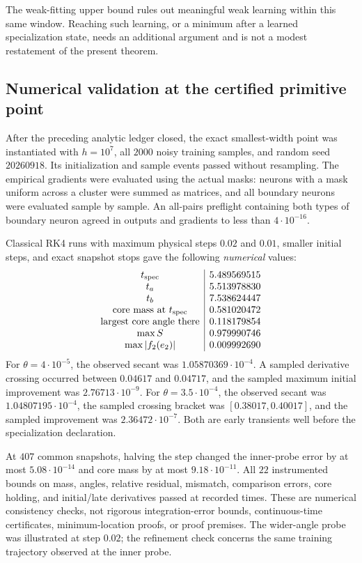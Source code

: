 \documentclass[11pt]{article}
\theoremstyle{remark}
\begin{document}
The weak-fitting upper bound rules out meaningful weak learning within
this same window. Reaching such learning, or a minimum after a learned
specialization state, needs an additional argument and is not a modest
restatement of the present theorem.

\subsection{Numerical validation at the certified primitive point}

After the preceding analytic ledger closed, the exact smallest-width
point was instantiated with $h=10^7$, all $2000$ noisy training samples,
and random seed $20260918$. Its initialization and sample events passed
without resampling. The empirical gradients were evaluated using the
actual masks: neurons with a mask uniform across a cluster were summed
as matrices, and all boundary neurons were evaluated sample by sample.
An all-pairs preflight containing both types of boundary neuron agreed
in outputs and gradients to less than $4\cdot10^{-16}$.

Classical RK4 runs with maximum physical steps $0.02$ and $0.01$,
smaller initial steps, and exact snapshot stops gave the following
\emph{numerical} values:
\[
\begin{array}{c|r}
 t_{\rm spec}&5.489569515\\
 t_a&5.513978830\\
 t_b&7.538624447\\
 \text{core mass at }t_{\rm spec}&0.581020472\\
 \text{largest core angle there}&0.118179854\\
 \max S&0.979990746\\
 \max |f_2(e_2)|&0.009992690
\end{array}
\]
For $\theta=4\cdot10^{-5}$, the observed secant was
$1.05870369\cdot10^{-4}$. A sampled derivative crossing occurred between
$0.04617$ and $0.04717$, and the sampled maximum initial improvement was
$2.76713\cdot10^{-9}$.
For $\theta=3.5\cdot10^{-4}$, the observed secant was
$1.04807195\cdot10^{-4}$, the sampled crossing bracket was
$[0.38017,0.40017]$, and the sampled improvement was
$2.36472\cdot10^{-7}$. Both are early transients well before the
specialization declaration.

At $407$ common snapshots, halving the step changed the inner-probe
error by at most $5.08\cdot10^{-14}$ and core mass by at most
$9.18\cdot10^{-11}$. All $22$ instrumented bounds on mass, angles,
relative residual, mismatch, comparison errors, core holding, and
initial/late derivatives passed at recorded times. These are numerical
consistency checks, not rigorous integration-error bounds, continuous-time
certificates, minimum-location proofs, or proof premises. The wider-angle
probe was illustrated at step $0.02$; the refinement check concerns the
same training trajectory observed at the inner probe.
\end{document}
